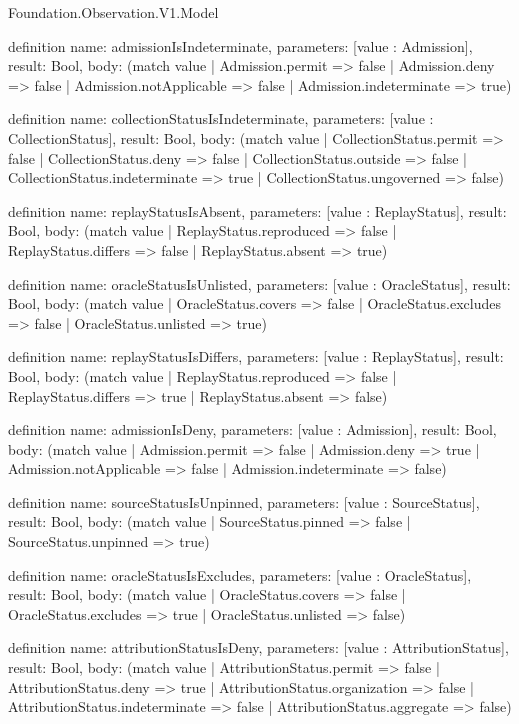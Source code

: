 \begin{lexlean}{Foundation.Observation.V1.Model}
\begin{semanticmodule}
definition{
  name: admissionIsIndeterminate,
  parameters: [value : Admission],
  result: Bool,
  body: (match value
    | Admission.permit => false
    | Admission.deny => false
    | Admission.notApplicable => false
    | Admission.indeterminate => true)
}

definition{
  name: collectionStatusIsIndeterminate,
  parameters: [value : CollectionStatus],
  result: Bool,
  body: (match value
    | CollectionStatus.permit => false
    | CollectionStatus.deny => false
    | CollectionStatus.outside => false
    | CollectionStatus.indeterminate => true
    | CollectionStatus.ungoverned => false)
}

definition{
  name: replayStatusIsAbsent,
  parameters: [value : ReplayStatus],
  result: Bool,
  body: (match value
    | ReplayStatus.reproduced => false
    | ReplayStatus.differs => false
    | ReplayStatus.absent => true)
}

definition{
  name: oracleStatusIsUnlisted,
  parameters: [value : OracleStatus],
  result: Bool,
  body: (match value
    | OracleStatus.covers => false
    | OracleStatus.excludes => false
    | OracleStatus.unlisted => true)
}

definition{
  name: replayStatusIsDiffers,
  parameters: [value : ReplayStatus],
  result: Bool,
  body: (match value
    | ReplayStatus.reproduced => false
    | ReplayStatus.differs => true
    | ReplayStatus.absent => false)
}

definition{
  name: admissionIsDeny,
  parameters: [value : Admission],
  result: Bool,
  body: (match value
    | Admission.permit => false
    | Admission.deny => true
    | Admission.notApplicable => false
    | Admission.indeterminate => false)
}

definition{
  name: sourceStatusIsUnpinned,
  parameters: [value : SourceStatus],
  result: Bool,
  body: (match value | SourceStatus.pinned => false | SourceStatus.unpinned => true)
}

definition{
  name: oracleStatusIsExcludes,
  parameters: [value : OracleStatus],
  result: Bool,
  body: (match value
    | OracleStatus.covers => false
    | OracleStatus.excludes => true
    | OracleStatus.unlisted => false)
}

definition{
  name: attributionStatusIsDeny,
  parameters: [value : AttributionStatus],
  result: Bool,
  body: (match value
    | AttributionStatus.permit => false
    | AttributionStatus.deny => true
    | AttributionStatus.organization => false
    | AttributionStatus.indeterminate => false
    | AttributionStatus.aggregate => false)
}


\end{semanticmodule}
\end{lexlean}
